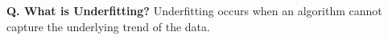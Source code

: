 \begin{frame}[fragile]{\textbf{Q. What is Underfitting?}}
  Underfitting occurs when an algorithm cannot capture the underlying trend of the data.
  \begin{columns}[T]
  \begin{column}{.58\textwidth}
\end{column}
\end{columns}
\end{frame}
